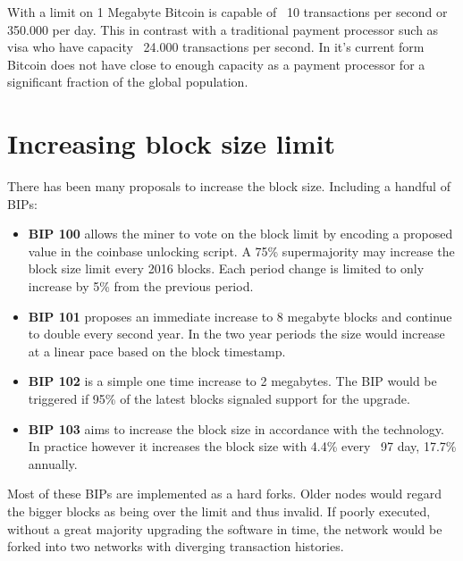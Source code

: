 
With a limit on 1 Megabyte Bitcoin is capable of ~10 transactions per second or 350.000 per day. This in contrast with a traditional payment processor such as visa who have capacity ~24.000 transactions per second. In it's current form Bitcoin does not have close to enough capacity as a payment processor for a significant fraction of the global population.

\section{Increasing block size limit}

There has been many proposals to increase the block size. Including a handful of BIPs:

\begin{itemize}
	
	\item \textbf{BIP 100} allows the miner to vote on the block limit by encoding a proposed value in the coinbase unlocking script. A 75\% supermajority may increase the block size limit every 2016 blocks. Each period change is limited to only increase by 5\% from the previous period.~\cite{bip:0100:dynamic:block:size}
	
	\item \textbf{BIP 101} proposes an immediate increase to 8 megabyte blocks and continue to double every second year. In the two year periods the size would increase at a linear pace based on the block timestamp.~\cite{bip:0101:increase:block:size}
	
	\item \textbf{BIP 102} is a simple one time increase to 2 megabytes. The BIP would be triggered if 95\% of the latest blocks signaled support for the upgrade.~\cite{bip:0102:increase:2mb}
	
	\item \textbf{BIP 103} aims to increase the block size in accordance with the technology. In practice however it increases the block size with 4.4\% every ~97 day, 17.7\% annually.~\cite{bip:0103:increase:with:technology}
\end{itemize}

Most of these BIPs are implemented as a hard forks. Older nodes would regard the bigger blocks as being over the limit and thus invalid.
If poorly executed, without a great majority upgrading the software in time, the network would be forked into two networks with diverging transaction histories. 

